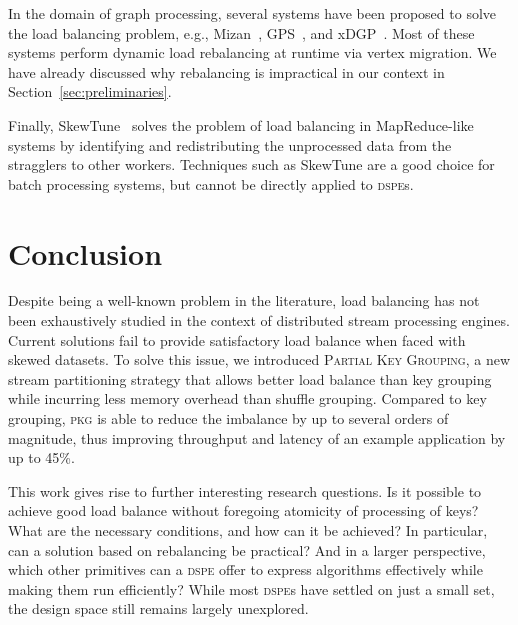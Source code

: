 \documentclass[10pt,conference,letterpaper]{IEEEtran}
\newcommand{\dspe}{\textsc{dspe}\xspace}
\newcommand{\dspes}{{\dspe}s\xspace}
\newcommand{\pkg}{\textsc{Partial Key Grouping}\xspace}
\newcommand{\pkgs}{\textsc{pkg}\xspace}
\begin{document}
In the domain of graph processing, several systems have been proposed to solve the load balancing problem, e.g., Mizan~\cite{khayyat2013mizan}, GPS~\cite{salihoglu2013gps}, and xDGP~\cite{vaqueroxdgp}.
Most of these systems perform dynamic load rebalancing at runtime via vertex migration.
We have already discussed why rebalancing is impractical in our context in Section~\ref{sec:preliminaries}.


Finally, SkewTune~\cite{kwon2012skewtune} solves the problem of load balancing in MapReduce-like systems by identifying and redistributing the unprocessed data from the stragglers to other workers.
Techniques such as SkewTune are a good choice for batch processing systems, but cannot be directly applied to \dspes. 






% 
\section{Conclusion}
Despite being a well-known problem in the literature, load balancing has not been exhaustively studied in the context of distributed stream processing engines.
Current solutions fail to provide satisfactory load balance when faced with skewed datasets. To solve this issue, we introduced \pkg, a new stream partitioning strategy that allows better load balance than key grouping while incurring less memory overhead than shuffle grouping.
Compared to key grouping, \pkgs is able to reduce the imbalance by up to several orders of magnitude, thus improving throughput and latency of an example application by up to 45\%. 

This work gives rise to further interesting research questions.
Is it possible to achieve good load balance without foregoing atomicity of processing of keys?
What are the necessary conditions, and how can it be achieved?
In particular, can a solution based on rebalancing be practical?
And in a larger perspective, which other primitives can a \dspe offer to express algorithms effectively while making them run efficiently?
While most \dspes have settled on just a small set, the design space still remains largely unexplored.









\end{document}
